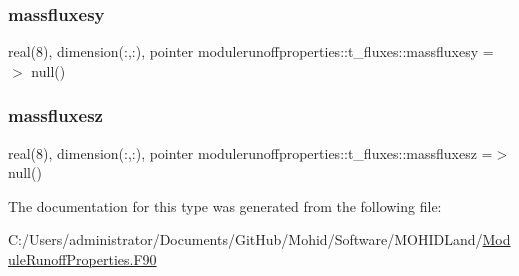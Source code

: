 \subsubsection{\texorpdfstring{massfluxesy}{massfluxesy}}
{\footnotesize\ttfamily real(8), dimension(\+:,\+:), pointer modulerunoffproperties\+::t\+\_\+fluxes\+::massfluxesy =$>$ null()\hspace{0.3cm}{\ttfamily [private]}}

\mbox{\label{structmodulerunoffproperties_1_1t__fluxes_a7e7f68c927e11137e10f8eb1092d810c}} 
\subsubsection{\texorpdfstring{massfluxesz}{massfluxesz}}
{\footnotesize\ttfamily real(8), dimension(\+:,\+:), pointer modulerunoffproperties\+::t\+\_\+fluxes\+::massfluxesz =$>$ null()\hspace{0.3cm}{\ttfamily [private]}}



The documentation for this type was generated from the following file\+:\begin{DoxyCompactItemize}
\item 
C\+:/\+Users/administrator/\+Documents/\+Git\+Hub/\+Mohid/\+Software/\+M\+O\+H\+I\+D\+Land/\mbox{\hyperlink{_module_runoff_properties_8_f90}{Module\+Runoff\+Properties.\+F90}}\end{DoxyCompactItemize}
